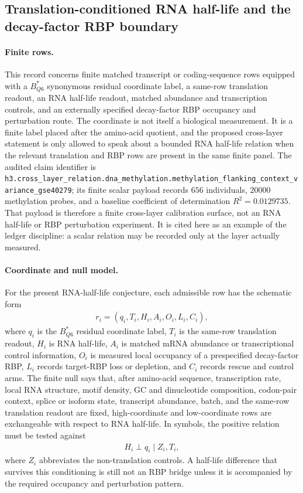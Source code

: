 \subsection{Translation-conditioned RNA half-life and the decay-factor RBP boundary}
\label{sec:bioreality-q6-translation-conditioned-rna-half-life-rbp-bridge}

\paragraph{Finite rows.}
This record concerns finite matched transcript or coding-sequence rows equipped with a $B^{\ast}_{Q6}$ synonymous residual coordinate label, a same-row translation readout, an RNA half-life readout, matched abundance and transcription controls, and an externally specified decay-factor RBP occupancy and perturbation route. The coordinate is not itself a biological measurement. It is a finite label placed after the amino-acid quotient, and the proposed cross-layer statement is only allowed to speak about a bounded RNA half-life relation when the relevant translation and RBP rows are present in the same finite panel. The audited claim identifier is \texttt{h3.cross\_layer\_relation.dna\_methylation.methylation\_flanking\_context\_variance\_gse40279}; its finite scalar payload records $656$ individuals, $20000$ methylation probes, and a baseline coefficient of determination $R^2=0.0129735$. That payload is therefore a finite cross-layer calibration surface, not an RNA half-life or RBP perturbation experiment. It is cited here as an example of the ledger discipline: a scalar relation may be recorded only at the layer actually measured.

\paragraph{Coordinate and null model.}
For the present RNA-half-life conjecture, each admissible row has the schematic form
$$
\begin{aligned}
r_i = (q_i,T_i,H_i,A_i,O_i,L_i,C_i),
\end{aligned}
$$
where $q_i$ is the $B^{\ast}_{Q6}$ residual coordinate label, $T_i$ is the same-row translation readout, $H_i$ is RNA half-life, $A_i$ is matched mRNA abundance or transcriptional control information, $O_i$ is measured local occupancy of a prespecified decay-factor RBP, $L_i$ records target-RBP loss or depletion, and $C_i$ records rescue and control arms. The finite null says that, after amino-acid sequence, transcription rate, local RNA structure, motif density, GC and dinucleotide composition, codon-pair context, splice or isoform state, transcript abundance, batch, and the same-row translation readout are fixed, high-coordinate and low-coordinate rows are exchangeable with respect to RNA half-life. In symbols, the positive relation must be tested against
$$
\begin{aligned}
H_i \perp q_i \mid Z_i,T_i,
\end{aligned}
$$
where $Z_i$ abbreviates the non-translation controls. A half-life difference that survives this conditioning is still not an RBP bridge unless it is accompanied by the required occupancy and perturbation pattern.

